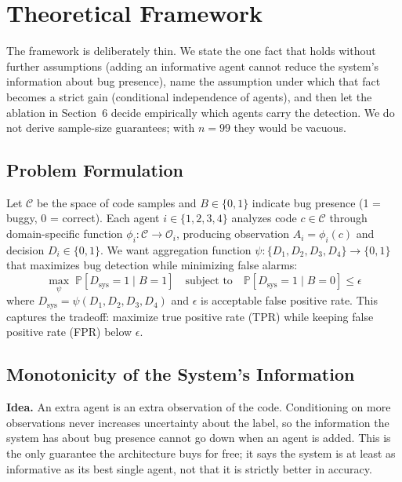 \documentclass[10pt,twocolumn]{article}
\begin{document}
\section{Theoretical Framework}

The framework is deliberately thin. We state the one fact that holds without further assumptions (adding an informative agent cannot reduce the system's information about bug presence), name the assumption under which that fact becomes a strict gain (conditional independence of agents), and then let the ablation in Section~6 decide empirically which agents carry the detection. We do not derive sample-size guarantees; with $n=99$ they would be vacuous.

\subsection{Problem Formulation}

Let $\mathcal{C}$ be the space of code samples and $B \in \{0, 1\}$ indicate bug presence (1 = buggy, 0 = correct). Each agent $i \in \{1, 2, 3, 4\}$ analyzes code $c \in \mathcal{C}$ through domain-specific function $\phi_i: \mathcal{C} \to \mathcal{O}_i$, producing observation $A_i = \phi_i(c)$ and decision $D_i \in \{0, 1\}$. We want aggregation function $\psi: \{D_1, D_2, D_3, D_4\} \to \{0, 1\}$ that maximizes bug detection while minimizing false alarms:
\begin{equation}
    \max_\psi \; \mathbb{P}[D_{\text{sys}} = 1 \mid B = 1] \quad \text{subject to} \quad \mathbb{P}[D_{\text{sys}} = 1 \mid B = 0] \leq \epsilon
\end{equation}
where $D_{\text{sys}} = \psi(D_1, D_2, D_3, D_4)$ and $\epsilon$ is acceptable false positive rate. This captures the tradeoff: maximize true positive rate (TPR) while keeping false positive rate (FPR) below $\epsilon$.

\subsection{Monotonicity of the System's Information}

\textbf{Idea.} An extra agent is an extra observation of the code. Conditioning on more observations never increases uncertainty about the label, so the information the system has about bug presence cannot go down when an agent is added. This is the only guarantee the architecture buys for free; it says the system is at least as informative as its best single agent, not that it is strictly better in accuracy.
\end{document}
